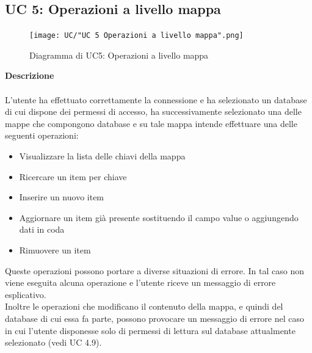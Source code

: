 \documentclass[a4paper]{article}
\begin{document}
		 \subsection{UC 5: Operazioni a livello mappa}
	 \begin{figure}[H]
				\centering
				\texttt{[image: UC/"UC 5 Operazioni a livello mappa".png]}
				\caption{Diagramma di UC5: Operazioni a livello mappa}
			\end{figure}
	\textbf{Descrizione} 
	\\ \\
	L'utente ha effettuato correttamente la connessione e ha selezionato un database di cui dispone dei permessi di accesso, ha successivamente selezionato una delle mappe che compongono database e su tale mappa intende effettuare una delle seguenti operazioni:
	\begin{itemize}
	\item Visualizzare la lista delle chiavi della mappa
	\item Ricercare un item per chiave
	\item Inserire un nuovo item
	\item Aggiornare un item già presente sostituendo il campo value o aggiungendo dati in coda
	\item Rimuovere un item
	\end{itemize}
	Queste operazioni possono portare a diverse situazioni di errore. In tal caso non viene eseguita alcuna operazione e l'utente riceve un messaggio di errore esplicativo. \\
	Inoltre le operazioni che modificano il contenuto della mappa, e quindi del database di cui essa fa parte, possono provocare un messaggio di errore nel caso in cui l'utente disponesse solo di permessi di lettura sul database attualmente selezionato (vedi UC 4.9).
\end{document}
